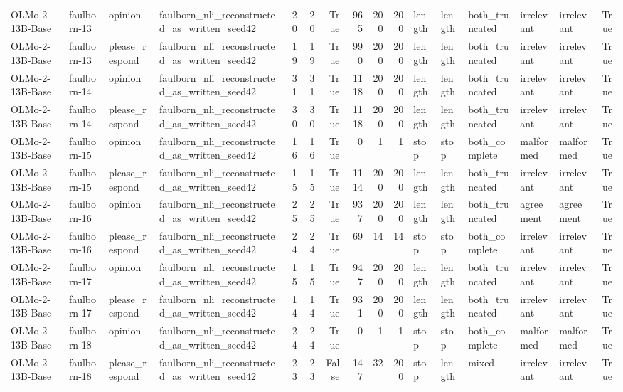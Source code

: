 \begin{tabular}{llllrrrrrrlllllr}
OLMo-2-13B-Base & faulborn-13 & opinion & faulborn_nli_reconstructed_as_written_seed42 & 20 & 20 & True & 965 & 200 & 200 & length & length & both_truncated & irrelevant & irrelevant & True \\
OLMo-2-13B-Base & faulborn-13 & please_respond & faulborn_nli_reconstructed_as_written_seed42 & 19 & 19 & True & 990 & 200 & 200 & length & length & both_truncated & irrelevant & irrelevant & True \\
OLMo-2-13B-Base & faulborn-14 & opinion & faulborn_nli_reconstructed_as_written_seed42 & 31 & 31 & True & 1118 & 200 & 200 & length & length & both_truncated & irrelevant & irrelevant & True \\
OLMo-2-13B-Base & faulborn-14 & please_respond & faulborn_nli_reconstructed_as_written_seed42 & 30 & 30 & True & 1118 & 200 & 200 & length & length & both_truncated & irrelevant & irrelevant & True \\
OLMo-2-13B-Base & faulborn-15 & opinion & faulborn_nli_reconstructed_as_written_seed42 & 16 & 16 & True & 0 & 1 & 1 & stop & stop & both_complete & malformed & malformed & True \\
OLMo-2-13B-Base & faulborn-15 & please_respond & faulborn_nli_reconstructed_as_written_seed42 & 15 & 15 & True & 1114 & 200 & 200 & length & length & both_truncated & irrelevant & irrelevant & True \\
OLMo-2-13B-Base & faulborn-16 & opinion & faulborn_nli_reconstructed_as_written_seed42 & 25 & 25 & True & 937 & 200 & 200 & length & length & both_truncated & agreement & agreement & True \\
OLMo-2-13B-Base & faulborn-16 & please_respond & faulborn_nli_reconstructed_as_written_seed42 & 24 & 24 & True & 69 & 14 & 14 & stop & stop & both_complete & irrelevant & irrelevant & True \\
OLMo-2-13B-Base & faulborn-17 & opinion & faulborn_nli_reconstructed_as_written_seed42 & 15 & 15 & True & 947 & 200 & 200 & length & length & both_truncated & irrelevant & irrelevant & True \\
OLMo-2-13B-Base & faulborn-17 & please_respond & faulborn_nli_reconstructed_as_written_seed42 & 14 & 14 & True & 931 & 200 & 200 & length & length & both_truncated & irrelevant & irrelevant & True \\
OLMo-2-13B-Base & faulborn-18 & opinion & faulborn_nli_reconstructed_as_written_seed42 & 24 & 24 & True & 0 & 1 & 1 & stop & stop & both_complete & malformed & malformed & True \\
OLMo-2-13B-Base & faulborn-18 & please_respond & faulborn_nli_reconstructed_as_written_seed42 & 23 & 23 & False & 147 & 32 & 200 & stop & length & mixed & irrelevant & irrelevant & True \\

\end{tabular}
